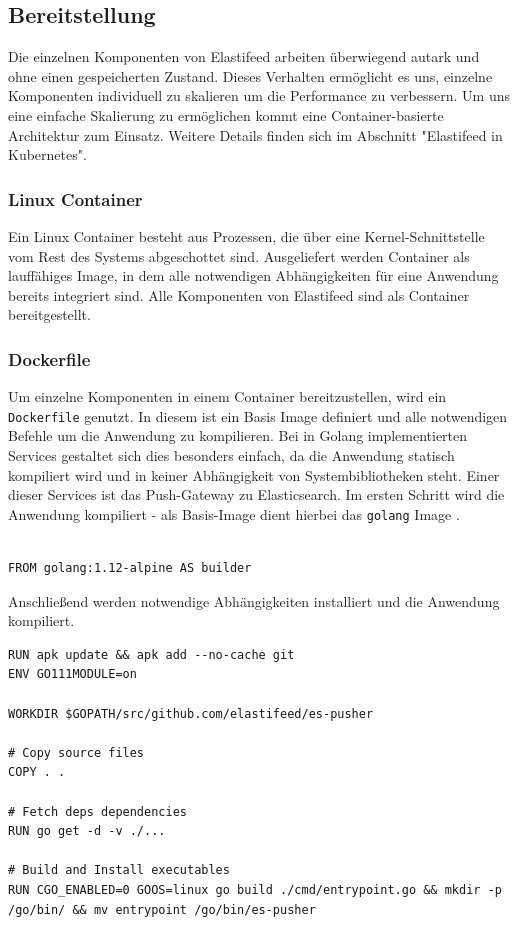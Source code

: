 \subsection{Bereitstellung}
Die einzelnen Komponenten von Elastifeed arbeiten überwiegend autark und ohne einen gespeicherten Zustand.
Dieses Verhalten ermöglicht es uns, einzelne Komponenten individuell zu skalieren um die Performance zu verbessern.
Um uns eine einfache Skalierung zu ermöglichen kommt eine Container-basierte Architektur zum Einsatz.
Weitere Details finden sich im Abschnitt "Elastifeed in Kubernetes".

\subsubsection{Linux Container}
Ein Linux Container besteht aus Prozessen, die über eine Kernel-Schnittstelle vom Rest des Systems abgeschottet sind. Ausgeliefert werden Container als lauffähiges Image, in dem alle notwendigen Abhängigkeiten für eine Anwendung bereits integriert sind.
Alle Komponenten von Elastifeed sind als Container bereitgestellt.

\subsubsection{Dockerfile}

Um einzelne Komponenten in einem Container bereitzustellen, wird ein \texttt{Dockerfile} genutzt.
In diesem ist ein Basis Image definiert und alle notwendigen Befehle um die Anwendung zu kompilieren.
Bei in Golang implementierten Services gestaltet sich dies besonders einfach, da die Anwendung statisch kompiliert wird und in keiner Abhängigkeit von Systembibliotheken steht.
Einer dieser Services ist das Push-Gateway zu Elasticsearch.
Im ersten Schritt wird die Anwendung kompiliert - als Basis-Image dient hierbei das \texttt{golang} Image \cite{god}.

\begin{verbatim}

FROM golang:1.12-alpine AS builder

\end{verbatim}

Anschließend werden notwendige Abhängigkeiten installiert und die Anwendung kompiliert.

\begin{verbatim}
RUN apk update && apk add --no-cache git
ENV GO111MODULE=on

WORKDIR $GOPATH/src/github.com/elastifeed/es-pusher

# Copy source files
COPY . .

# Fetch deps dependencies
RUN go get -d -v ./...

# Build and Install executables
RUN CGO_ENABLED=0 GOOS=linux go build ./cmd/entrypoint.go && mkdir -p /go/bin/ && mv entrypoint /go/bin/es-pusher
\end{verbatim}

